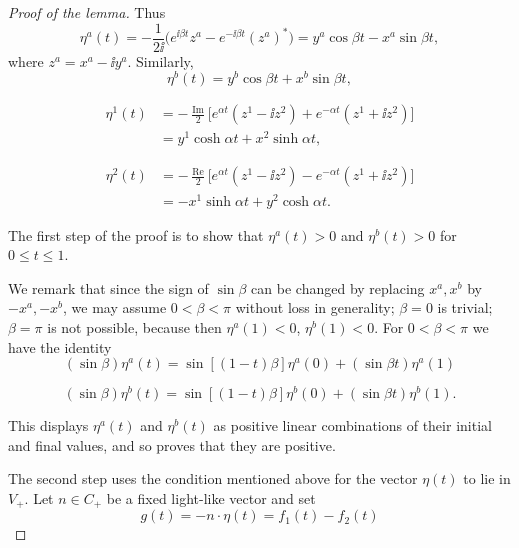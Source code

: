 \begin{proof}[Proof of the lemma]
Thus
\begin{equation*}
  \eta^a(t)=-\frac{1}{2\ii}
  \bigl(e^{\ii\beta t}z^a-e^{-\ii\beta t}(z^a)^*\bigr)
  =y^a\cos\beta t-x^a\sin\beta t,
\end{equation*}
where $z^a=x^a-\ii y^a$.  Similarly,
\begin{equation*}
  \eta^b(t)=y^b\cos\beta t+x^b\sin\beta t,
\end{equation*}

\begin{equation*}
  \begin{aligned}
  \eta^1(t)
  &=-\frac{\operatorname{Im}}{2}
    \bigl[e^{\alpha t}(z^1-\ii z^2)+e^{-\alpha t}(z^1+\ii z^2)\bigr]\\
  &=y^1\cosh\alpha t+x^2\sinh\alpha t,
  \end{aligned}
\end{equation*}

\begin{equation*}
  \begin{aligned}
  \eta^2(t)
  &=-\frac{\operatorname{Re}}{2}
    \bigl[e^{\alpha t}(z^1-\ii z^2)-e^{-\alpha t}(z^1+\ii z^2)\bigr]\\
  &=-x^1\sinh\alpha t+y^2\cosh\alpha t .
  \end{aligned}
\end{equation*}

The first step of the proof is to show that $\eta^a(t)>0$ and
$\eta^b(t)>0$ for $0\leq t\leq1$.

We remark that since the sign of $\sin\beta$ can be changed by replacing
$x^a,x^b$ by $-x^a,-x^b$, we may assume $0<\beta<\pi$ without loss in
generality; $\beta=0$ is trivial; $\beta=\pi$ is not possible, because then
$\eta^a(1)<0$, $\eta^b(1)<0$.  For $0<\beta<\pi$ we have the identity
\begin{equation*}
  (\sin\beta)\eta^a(t)
  =\sin[(1-t)\beta]\eta^a(0)+(\sin\beta t)\eta^a(1)
\end{equation*}

\begin{equation*}
  (\sin\beta)\eta^b(t)
  =\sin[(1-t)\beta]\eta^b(0)+(\sin\beta t)\eta^b(1) .
\end{equation*}

This displays $\eta^a(t)$ and $\eta^b(t)$ as positive linear combinations of
their initial and final values, and so proves that they are positive.

The second step uses the condition mentioned above for the vector $\eta(t)$ to
lie in $V_{+}$.  Let $n\in C_{+}$ be a fixed light-like vector and set
\begin{equation*}
  g(t)=-n\mathbin{\cdot}\eta(t)=f_1(t)-f_2(t)
\end{equation*}


\end{proof}

